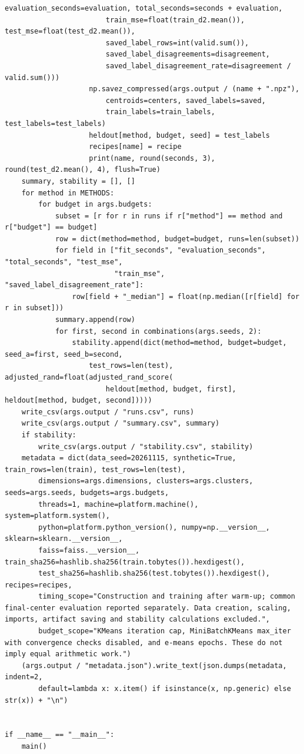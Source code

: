 \begin{Verbatim}[breaklines,breakanywhere,fontsize=\small]
                        evaluation_seconds=evaluation, total_seconds=seconds + evaluation,
                        train_mse=float(train_d2.mean()), test_mse=float(test_d2.mean()),
                        saved_label_rows=int(valid.sum()),
                        saved_label_disagreements=disagreement,
                        saved_label_disagreement_rate=disagreement / valid.sum()))
                    np.savez_compressed(args.output / (name + ".npz"),
                        centroids=centers, saved_labels=saved,
                        train_labels=train_labels, test_labels=test_labels)
                    heldout[method, budget, seed] = test_labels
                    recipes[name] = recipe
                    print(name, round(seconds, 3), round(test_d2.mean(), 4), flush=True)
    summary, stability = [], []
    for method in METHODS:
        for budget in args.budgets:
            subset = [r for r in runs if r["method"] == method and r["budget"] == budget]
            row = dict(method=method, budget=budget, runs=len(subset))
            for field in ["fit_seconds", "evaluation_seconds", "total_seconds", "test_mse",
                          "train_mse", "saved_label_disagreement_rate"]:
                row[field + "_median"] = float(np.median([r[field] for r in subset]))
            summary.append(row)
            for first, second in combinations(args.seeds, 2):
                stability.append(dict(method=method, budget=budget, seed_a=first, seed_b=second,
                    test_rows=len(test), adjusted_rand=float(adjusted_rand_score(
                        heldout[method, budget, first], heldout[method, budget, second]))))
    write_csv(args.output / "runs.csv", runs)
    write_csv(args.output / "summary.csv", summary)
    if stability:
        write_csv(args.output / "stability.csv", stability)
    metadata = dict(data_seed=20261115, synthetic=True, train_rows=len(train), test_rows=len(test),
        dimensions=args.dimensions, clusters=args.clusters, seeds=args.seeds, budgets=args.budgets,
        threads=1, machine=platform.machine(), system=platform.system(),
        python=platform.python_version(), numpy=np.__version__, sklearn=sklearn.__version__,
        faiss=faiss.__version__, train_sha256=hashlib.sha256(train.tobytes()).hexdigest(),
        test_sha256=hashlib.sha256(test.tobytes()).hexdigest(), recipes=recipes,
        timing_scope="Construction and training after warm-up; common final-center evaluation reported separately. Data creation, scaling, imports, artifact saving and stability calculations excluded.",
        budget_scope="KMeans iteration cap, MiniBatchKMeans max_iter with convergence checks disabled, and e-means epochs. These do not imply equal arithmetic work.")
    (args.output / "metadata.json").write_text(json.dumps(metadata, indent=2,
        default=lambda x: x.item() if isinstance(x, np.generic) else str(x)) + "\n")


if __name__ == "__main__":
    main()
\end{Verbatim}

